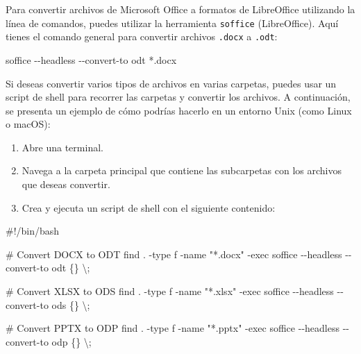 \documentclass[
  jou,
  floatsintext,
  longtable,
  a4paper,
  nolmodern,
  notxfonts,
  notimes,
  12pt,
  colorlinks=true,linkcolor=blue,citecolor=blue,urlcolor=blue]{apa7}
\newenvironment{Shaded}{\begin{snugshade}}{\end{snugshade}}
\newcommand{\AttributeTok}[1]{\textcolor[rgb]{0.40,0.45,0.13}{#1}}
\newcommand{\CommentTok}[1]{\textcolor[rgb]{0.37,0.37,0.37}{#1}}
\newcommand{\DataTypeTok}[1]{\textcolor[rgb]{0.68,0.00,0.00}{#1}}
\newcommand{\ExtensionTok}[1]{\textcolor[rgb]{0.00,0.23,0.31}{#1}}
\newcommand{\FunctionTok}[1]{\textcolor[rgb]{0.28,0.35,0.67}{#1}}
\newcommand{\NormalTok}[1]{\textcolor[rgb]{0.00,0.23,0.31}{#1}}
\newcommand{\PreprocessorTok}[1]{\textcolor[rgb]{0.68,0.00,0.00}{#1}}
\newcommand{\StringTok}[1]{\textcolor[rgb]{0.13,0.47,0.30}{#1}}
\providecommand{\tightlist}{%
  \setlength{\itemsep}{0pt}\setlength{\parskip}{0pt}}
\begin{document}
Para convertir archivos de Microsoft Office a formatos de LibreOffice
utilizando la línea de comandos, puedes utilizar la herramienta
\texttt{soffice} (LibreOffice). Aquí tienes el comando general para
convertir archivos \texttt{.docx} a \texttt{.odt}:

\begin{Shaded}
\begin{Highlighting}[]
\ExtensionTok{soffice} \AttributeTok{{-}{-}headless} \AttributeTok{{-}{-}convert{-}to}\NormalTok{ odt }\PreprocessorTok{*}\NormalTok{.docx}
\end{Highlighting}
\end{Shaded}

Si deseas convertir varios tipos de archivos en varias carpetas, puedes
usar un script de shell para recorrer las carpetas y convertir los
archivos. A continuación, se presenta un ejemplo de cómo podrías hacerlo
en un entorno Unix (como Linux o macOS):

\begin{enumerate}
\def\labelenumi{\arabic{enumi}.}
\tightlist
\item
  Abre una terminal.
\item
  Navega a la carpeta principal que contiene las subcarpetas con los
  archivos que deseas convertir.
\item
  Crea y ejecuta un script de shell con el siguiente contenido:
\end{enumerate}

\begin{Shaded}
\begin{Highlighting}[]
\CommentTok{\#!/bin/bash}

\CommentTok{\# Convert DOCX to ODT}
\FunctionTok{find}\NormalTok{ . }\AttributeTok{{-}type}\NormalTok{ f }\AttributeTok{{-}name} \StringTok{"*.docx"} \AttributeTok{{-}exec}\NormalTok{ soffice }\AttributeTok{{-}{-}headless} \AttributeTok{{-}{-}convert{-}to}\NormalTok{ odt \{\} }\DataTypeTok{\textbackslash{};}

\CommentTok{\# Convert XLSX to ODS}
\FunctionTok{find}\NormalTok{ . }\AttributeTok{{-}type}\NormalTok{ f }\AttributeTok{{-}name} \StringTok{"*.xlsx"} \AttributeTok{{-}exec}\NormalTok{ soffice }\AttributeTok{{-}{-}headless} \AttributeTok{{-}{-}convert{-}to}\NormalTok{ ods \{\} }\DataTypeTok{\textbackslash{};}

\CommentTok{\# Convert PPTX to ODP}
\FunctionTok{find}\NormalTok{ . }\AttributeTok{{-}type}\NormalTok{ f }\AttributeTok{{-}name} \StringTok{"*.pptx"} \AttributeTok{{-}exec}\NormalTok{ soffice }\AttributeTok{{-}{-}headless} \AttributeTok{{-}{-}convert{-}to}\NormalTok{ odp \{\} }\DataTypeTok{\textbackslash{};}
\end{Highlighting}
\end{Shaded}
\end{document}

